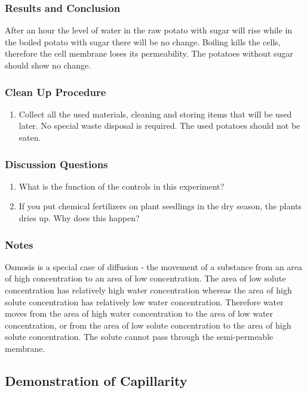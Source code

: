 \subsubsection*{Results and Conclusion}
After an hour the level of water in the raw potato with sugar will rise while in the boiled potato with sugar there will be no change. Boiling kills the cells, therefore the cell membrane loses its permeability. The potatoes without sugar should show no change.

\subsubsection*{Clean Up Procedure}
\begin{enumerate}
\item{Collect all the used materials, cleaning and storing items that will be used later. No special waste disposal is required. The used potatoes should not be eaten.}
\end{enumerate}

\subsubsection*{Discussion Questions}
\begin{enumerate}
\item{What is the function of the controls in this experiment?}
\item{If you put chemical fertilizers on plant seedlings in the dry season, the plants dries up. Why does this happen?}
\end{enumerate}

\subsubsection*{Notes}
Osmosis is a special case of diffusion - the movement of a substance from an area of high concentration to an area of low concentration. The area of low solute concentration has relatively high water concentration whereas the area of high solute concentration has relatively low water concentration. Therefore water moves from the area of high water concentration to the area of low water concentration, or from the area of low solute concentration to the area of high solute concentration. The solute cannot pass through the semi-permeable membrane.

\subsection{Demonstration of Capillarity}

